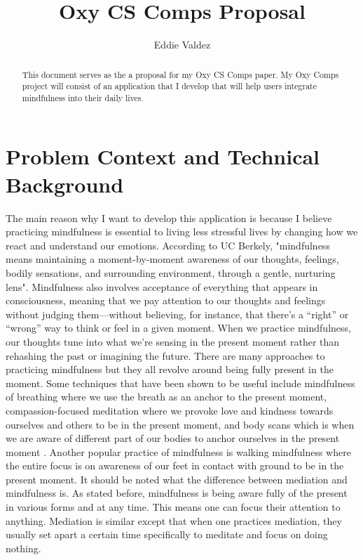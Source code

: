 \documentclass[12pt,twocolumn]{article}
\title{Oxy CS Comps Proposal}
\author{Eddie Valdez}
\affiliation{Occidental College}
\begin{document}
\maketitle

\begin{abstract}
    This document serves as the a proposal for my Oxy CS Comps paper. My Oxy Comps project will consist of an application that I develop that will help users integrate mindfulness into their daily lives. 
\end{abstract}

\section{Problem Context and Technical Background}


The main reason why I want to develop this application is because I believe practicing mindfulness is essential to living less stressful lives by changing how we react and understand our emotions. According to UC Berkely, "mindfulness means maintaining a moment-by-moment awareness of our thoughts, feelings, bodily sensations, and surrounding environment, through a gentle, nurturing lens"\cite{greatergood}. Mindfulness also involves acceptance of everything that appears in consciousness, meaning that we pay attention to our thoughts and feelings without judging them—without believing, for instance, that there’s a “right” or “wrong” way to think or feel in a given moment. When we practice mindfulness, our thoughts tune into what we’re sensing in the present moment rather than rehashing the past or imagining the future. There are many approaches to practicing mindfulness but they all revolve around being fully present in the moment. Some techniques that have been shown to be useful include mindfulness of breathing where we use the breath as an anchor to the present moment, compassion-focused meditation where we provoke love and kindness towards ourselves and others to be in the present moment, and body scans which is when we are aware of different part of our bodies to anchor ourselves in the present moment \cite{behan_2020}. Another popular practice of mindfulness is walking mindfulness where the entire focus is on awareness of our feet in contact with ground to be in the present moment. It should be noted what the difference between mediation and mindfulness is. As stated before, mindfulness is being aware fully of the present in various forms and at any time. This means one can focus their attention to anything. Mediation is similar except that when one practices mediation, they usually set apart a certain time specifically to meditate and focus on doing nothing.
\end{document}
